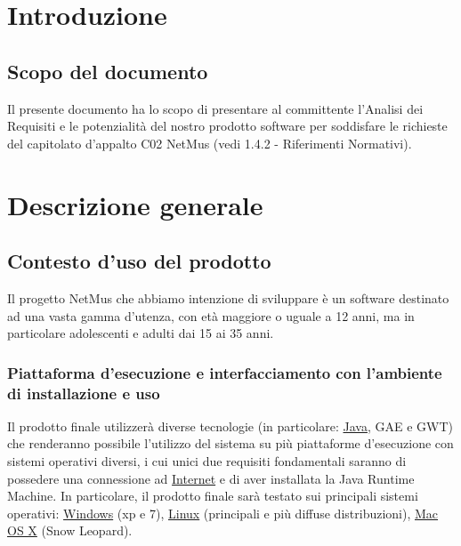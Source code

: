 \chapter{Introduzione}
\thispagestyle{fancy} %

\section{Scopo del documento}
Il presente documento ha lo scopo di presentare al committente l'Analisi dei
Requisiti e le potenzialit\`a del nostro prodotto software per soddisfare le
richieste del capitolato d'appalto C02 NetMus (vedi 1.4.2 - Riferimenti
Normativi).



\chapter{Descrizione generale}
\thispagestyle{fancy}

\section{Contesto d'uso del prodotto}
Il progetto NetMus che abbiamo intenzione di sviluppare \`e un software
destinato ad una vasta gamma d'utenza, con et\`a maggiore o uguale
a 12 anni, ma in particolare adolescenti e adulti dai 15 ai 35 anni.

\subsection{Piattaforma d'esecuzione e interfacciamento con l'ambiente di
installazione e uso}
Il prodotto finale utilizzer\`a diverse tecnologie (in particolare: \underline{Java}, GAE e
GWT) che renderanno possibile l'utilizzo del sistema su pi\`u piattaforme
d'esecuzione con sistemi operativi diversi, i cui unici due requisiti
fondamentali saranno di possedere una connessione ad \underline{Internet} e di aver
installata la Java Runtime Machine. In particolare, il prodotto finale sar\`a
testato sui principali sistemi operativi: \underline{Windows} (xp e 7), \underline{Linux} (principali e
pi\`u diffuse distribuzioni), \underline{Mac OS X} (Snow Leopard).
